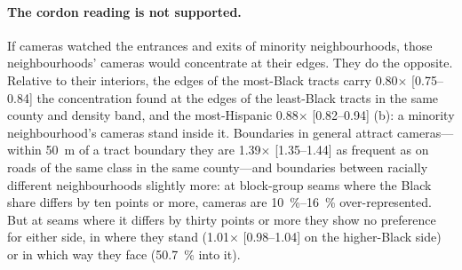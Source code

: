\documentclass[11pt,twoside]{article}
\begin{document}
\paragraph{The cordon reading is not supported.} If cameras watched the entrances and exits of
minority neighbourhoods, those neighbourhoods' cameras would concentrate at their edges. They do
the opposite. Relative to their interiors, the edges of the most-Black tracts carry
\num{0.80}$\times$ [0.75--0.84] the concentration found at the edges of the least-Black tracts
in the same county and density band, and the most-Hispanic \num{0.88}$\times$ [0.82--0.94]
(b): a minority neighbourhood's cameras stand inside it. Boundaries in general
attract cameras---within \SI{50}{\metre} of a tract boundary they are \num{1.39}$\times$
[1.35--1.44] as frequent as on roads of the same class in the same county---and boundaries
between racially different neighbourhoods slightly more: at block-group seams where the Black
share differs by ten points or more, cameras are \SIrange{10}{16}{\percent} over-represented. But
at seams where it differs by thirty points or more they show no preference for either side, in where they stand (\num{1.01}$\times$
[0.98--1.04] on the higher-Black side) or in which way they face (\SI{50.7}{\percent} into it).
\end{document}
